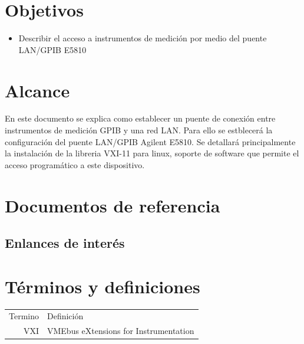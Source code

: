 \documentclass[paper=letter,oneside,fontsize=11pt, parskip=full]{scrartcl}
\newenvironment{link}
	{\ttfamily}{}
\begin{document}
	
	\clearpage
	
	\tableofcontents
	
	\section{Objetivos}
		\begin{itemize}
			\item Describir el acceso a instrumentos de medición por medio del puente LAN/GPIB E5810
		
		\end{itemize}
		
	\section{Alcance}
	
		En este documento se explica como establecer un puente de conexión entre instrumentos de medición GPIB y una red LAN. Para ello se estblecerá la configuración del puente LAN/GPIB Agilent E5810. Se detallará principalmente la instalación de la libreria VXI-11 para linux, soporte de software que permite el acceso programático a este dispositivo.	
		
	\section{Documentos de referencia}
	
		\subsection{Enlances de interés}

	
			\begin{link}

			\end{link}	
	

	
	\section{Términos y definiciones}
	
		\begin{tabular}{rl}
			Termino 	& 	Definición \\	
			VXI			& 	VMEbus eXtensions for Instrumentation \\
		\end{tabular}
	
\end{document}
